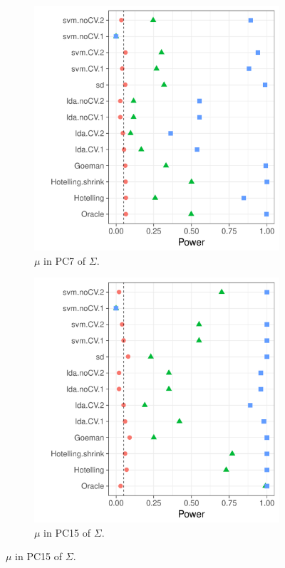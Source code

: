 \documentclass[12pt,a4paper]{article}
\begin{document}
\begin{figure}[h]
	\centering
	\caption{Short memory, AR(1) correlation. $\Vert \mu \Vert_2$ fixed. }	
	\label{fig:dependence_4}	
	\begin{subfigure}[t]{.4\textwidth}
		\centering
		\includegraphics[width=1\linewidth]{"art/file32"}
		\caption{$\mu$ in PC7 of $\Sigma$.}  
		\label{fig:dependence_41}	
	\end{subfigure}
	\begin{subfigure}[t]{0.4\textwidth}
		\centering
		\includegraphics[width=1\linewidth]{"art/file31"}
		\caption{$\mu$ in PC15 of $\Sigma$.}  
		\label{fig:dependence_42}	
	\end{subfigure}

\end{figure}
\end{document}

